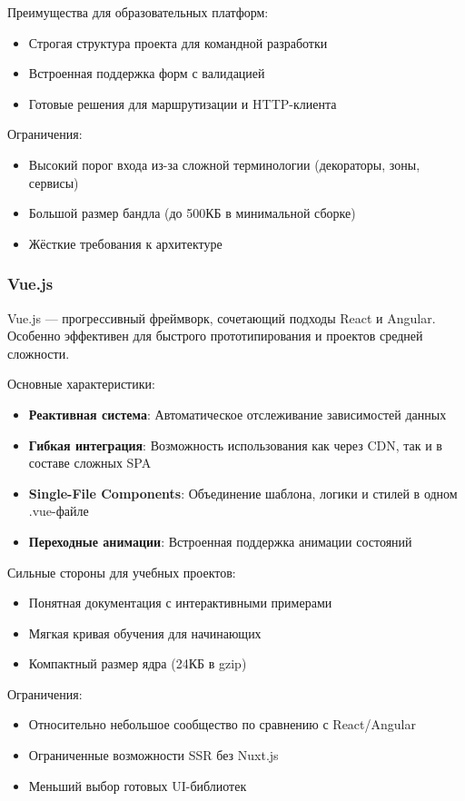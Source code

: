 Преимущества для образовательных платформ:
\begin{itemize}
\item Строгая структура проекта для командной разработки
\item Встроенная поддержка форм с валидацией
\item Готовые решения для маршрутизации и HTTP-клиента
\end{itemize}

Ограничения:
\begin{itemize}
\item Высокий порог входа из-за сложной терминологии (декораторы, зоны, сервисы)
\item Большой размер бандла (до 500КБ в минимальной сборке)
\item Жёсткие требования к архитектуре
\end{itemize}


\subsubsection{Vue.js}

Vue.js — прогрессивный фреймворк, сочетающий подходы React и Angular. Особенно эффективен для быстрого прототипирования и проектов средней сложности.

Основные характеристики:
\begin{itemize}
\item \textbf{Реактивная система}: Автоматическое отслеживание зависимостей данных
\item \textbf{Гибкая интеграция}: Возможность использования как через CDN, так и в составе сложных SPA
\item \textbf{Single-File Components}: Объединение шаблона, логики и стилей в одном .vue-файле
\item \textbf{Переходные анимации}: Встроенная поддержка анимации состояний
\end{itemize}

Сильные стороны для учебных проектов:
\begin{itemize}
\item Понятная документация с интерактивными примерами
\item Мягкая кривая обучения для начинающих
\item Компактный размер ядра (24КБ в gzip)
\end{itemize}

Ограничения:
\begin{itemize}
\item Относительно небольшое сообщество по сравнению с React/Angular
\item Ограниченные возможности SSR без Nuxt.js
\item Меньший выбор готовых UI-библиотек
\end{itemize}


